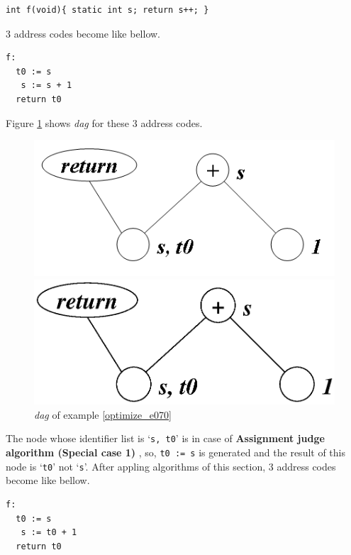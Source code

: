 \begin{Example}
\label{optimize_e070}
\begin{verbatim}
int f(void){ static int s; return s++; }
\end{verbatim}
3 address codes become like bellow.
\begin{verbatim}
f:
  t0 := s
   s := s + 1
  return t0
\end{verbatim}
Figure \ref{optimize_e071} shows {\em dag} for these 3 address codes.
\begin{figure}[htbp]
\begin{center}
\begin{htmlonly}
\includegraphics[width=0.8\linewidth,height=0.347\linewidth]{opt029.png}
\end{htmlonly}
\begin{latexonly}
\includegraphics[width=0.8\linewidth,height=0.347\linewidth]{opt029.eps}
\end{latexonly}
\caption{{\em dag} of example \ref{optimize_e070}}
\label{optimize_e071}
\end{center}
\end{figure}
The node whose identifier list is `{\tt{s, t0}}'
is in case of {\bf Assignment judge algorithm (Special case 1) },
so, {\tt{t0 := s}} is generated and the result of this node
is `{\tt{t0}}' not `{\tt{s}}'.
After appling algorithms of this section,
3 address codes become like bellow.
\begin{verbatim}
f:
  t0 := s
   s := t0 + 1
  return t0
\end{verbatim}
\end{Example}

